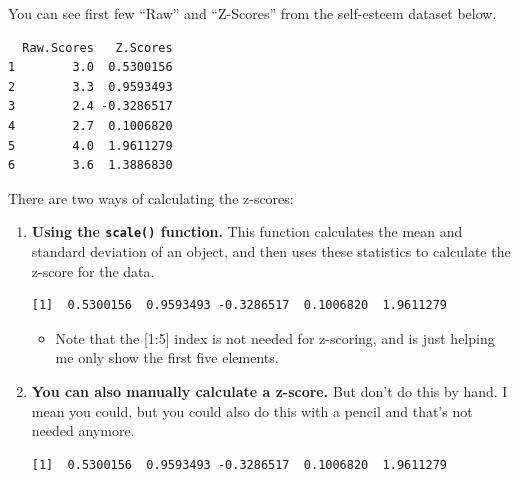 \documentclass[
  letterpaper,
  DIV=11,
  numbers=noendperiod,
  oneside]{scrreprt}
\newenvironment{Shaded}{\begin{snugshade}}{\end{snugshade}}
\newcommand{\AttributeTok}[1]{\textcolor[rgb]{0.40,0.45,0.13}{#1}}
\newcommand{\CommentTok}[1]{\textcolor[rgb]{0.37,0.37,0.37}{#1}}
\newcommand{\DecValTok}[1]{\textcolor[rgb]{0.68,0.00,0.00}{#1}}
\newcommand{\FunctionTok}[1]{\textcolor[rgb]{0.28,0.35,0.67}{#1}}
\newcommand{\NormalTok}[1]{\textcolor[rgb]{0.00,0.23,0.31}{#1}}
\newcommand{\OtherTok}[1]{\textcolor[rgb]{0.00,0.23,0.31}{#1}}
\newcommand{\SpecialCharTok}[1]{\textcolor[rgb]{0.37,0.37,0.37}{#1}}
\providecommand{\tightlist}{%
  \setlength{\itemsep}{0pt}\setlength{\parskip}{0pt}}\usepackage{longtable,booktabs,array}
\begin{document}
You can see first few ``Raw'' and ``Z-Scores'' from the self-esteem
dataset below.

\begin{verbatim}
  Raw.Scores   Z.Scores
1        3.0  0.5300156
2        3.3  0.9593493
3        2.4 -0.3286517
4        2.7  0.1006820
5        4.0  1.9611279
6        3.6  1.3886830
\end{verbatim}

There are two ways of calculating the z-scores:

\begin{enumerate}
\def\labelenumi{\arabic{enumi}.}
\item
  \textbf{Using the \texttt{scale()} function.} This function calculates
  the mean and standard deviation of an object, and then uses these
  statistics to calculate the z-score for the data.

\begin{Shaded}
\end{Shaded}

\begin{verbatim}
[1]  0.5300156  0.9593493 -0.3286517  0.1006820  1.9611279
\end{verbatim}

  \begin{itemize}
  \tightlist
  \item
    Note that the {[}1:5{]} index is not needed for z-scoring, and is
    just helping me only show the first five elements.
  \end{itemize}
\item
  \textbf{You can also manually calculate a z-score.} But don't do this
  by hand. I mean you could, but you could also do this with a pencil
  and that's not needed anymore.

\begin{Shaded}
\end{Shaded}

\begin{verbatim}
[1]  0.5300156  0.9593493 -0.3286517  0.1006820  1.9611279
\end{verbatim}
\end{enumerate}
\end{document}

